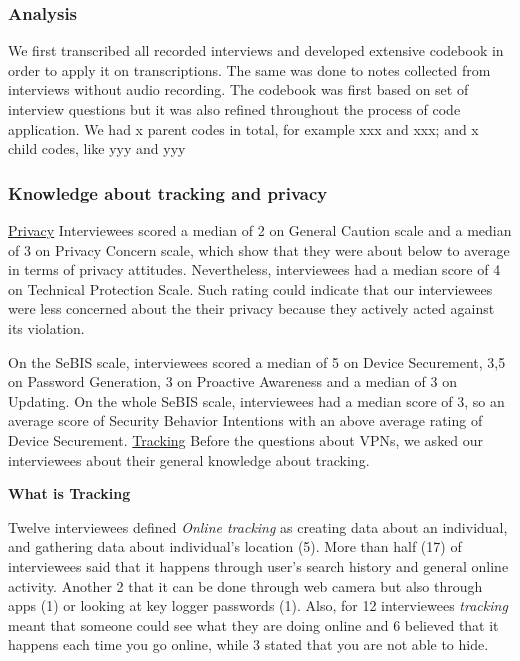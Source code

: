\subsubsection{Analysis} We first transcribed all recorded interviews and
developed extensive codebook in order to apply it on transcriptions. The same
was done to notes collected from interviews without audio recording. The
codebook was first based on set of interview questions but it was also refined
throughout the process of code application. We had x parent codes in total,
for example xxx and xxx; and x child codes, like yyy and yyy
\subsubsection{Knowledge about tracking and privacy}
\label{sec:methods-tracking}

\underline{Privacy} Interviewees scored a median of 2 on General Caution scale
and a median of 3 on Privacy Concern scale, which show that they were about
below to average in terms of privacy attitudes. Nevertheless, interviewees had
a median score of 4 on Technical Protection Scale. Such rating could indicate
that our interviewees were less concerned  about the their privacy because
they actively acted against its violation. 

On the SeBIS scale, interviewees scored a median of 5 on Device Securement,
3,5 on Password Generation, 3 on Proactive Awareness and a median of 3 on
Updating. On the whole SeBIS scale, interviewees had a median score of 3, so
an average score of Security Behavior Intentions with an above average rating
of Device Securement.  \underline{Tracking} Before the questions about VPNs,
we asked our interviewees about their general knowledge about tracking. 











\textbf{What is Tracking}

Twelve interviewees defined \textit{Online tracking} as creating data about an
individual, and gathering data about individual's location (5). More than half
(17) of interviewees said that it happens through user's search history and
general online activity. Another 2 that it can be done through web camera but
also through apps (1) or looking at key logger passwords (1). Also, for 12
interviewees  \textit{tracking} meant that someone could see what they are
doing online and 6 believed that it happens each time you go online, while 3
stated that you are not able to hide.

